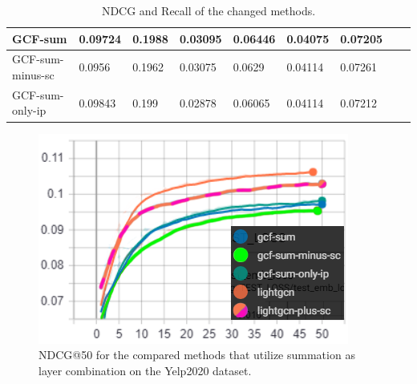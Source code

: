 \begin{table}[]
\begin{tabular}{|l|l|l|l|l|l|l|l|l|}
        GCF-sum              & 0.09724                       & 0.1988                                 & 0.03095                          & 0.06446             & 0.04075             & 0.07205             \\ \hline
        GCF-sum-minus-sc     & 0.0956                        & 0.1962                                 & 0.03075                          & 0.0629              & 0.04114             & 0.07261             \\ \hline
        GCF-sum-only-ip      & 0.09843                       & 0.199                                  & 0.02878                          & 0.06065             & 0.04114             & 0.07212             \\ \hline
    \end{tabular}
    \caption{NDCG and Recall of the changed methods.}
    \label{tab:ablation-results}
\end{table}
\begin{figure}[h!]
    \includegraphics[width=\linewidth]{figures/gcf-sum-ndcg.png}
    \caption{NDCG@50 for the compared methods that utilize summation as layer combination on the Yelp2020 dataset.}
    \label{fig:GCF-sum-NDCG-ablation-study}
\end{figure}

